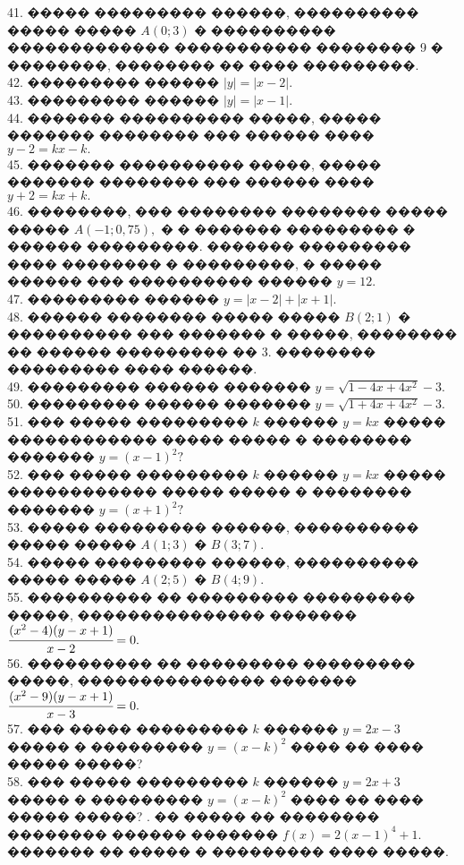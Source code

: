 \documentclass[12pt]{article}
\begin{document}
41. ����� ��������� ������, ���������� ����� ����� $A(0;3)$ � ���������� ������������� ����������� �������� 9 � ��������, �������� �� ���� ���������.\\
42. ��������� ������ $|y|=|x-2|.$\\
43. ��������� ������ $|y|=|x-1|.$\\
44. ������� ���������� �����, ����� ������� �������� ��� ������ ���� $y-2=kx-k.$\\
45. ������� ���������� �����, ����� ������� �������� ��� ������ ���� $y+2=kx+k.$\\
46. ��������, ��� �������� �������� ����� ����� $A(-1;0,75),$ � � ������� ��������� � ������ ���������. ������� ��������� ���� �������� � ���������, � ����� ������ ��� ���������� ������ $y=12.$\\
47. ��������� ������ $y=|x-2|+|x+1|.$\\
48. ������ �������� ����� ����� $B(2;1)$ � ���������� ��� ������� � �����, �������� �� ������ ��������� �� 3. �������� ��������� ���� ������.\\
49. ��������� ������ ������� $y=\sqrt{1-4x+4x^2}-3.$\\
50. ��������� ������ ������� $y=\sqrt{1+4x+4x^2}-3.$\\
51. ��� ����� ��������� $k$ ������ $y=kx$ ����� ������������ ����� �����
� �������� ������� $y=(x-1)^2?$\\
52. ��� ����� ��������� $k$ ������ $y=kx$ ����� ������������ ����� �����
� �������� ������� $y=(x+1)^2?$\\
53. ����� ��������� ������, ���������� ����� ����� $A(1;3)$ � $B(3;7).$\\
54. ����� ��������� ������, ���������� ����� ����� $A(2;5)$ � $B(4;9).$\\
55. ���������� �� ��������� ��������� �����, ��������������� �������
$\cfrac{(x^2-4)(y-x+1)}{x-2}=0.$\\
56. ���������� �� ��������� ��������� �����, ��������������� �������
$\cfrac{(x^2-9)(y-x+1)}{x-3}=0.$\\
57. ��� ����� ��������� $k$ ������ $y=2x-3$ ����� � ��������� $y=(x-k)^2$ ���� �� ���� ����� �����?\\
58. ��� ����� ��������� $k$ ������ $y=2x+3$ ����� � ��������� $y=(x-k)^2$ ���� �� ���� ����� �����?
\newpage
{}. �� ����� �� �������� �������� ������ ������� $f(x)=2(x-1)^4+1.$ ������� �� ����� � ��������� ���� �����.\\
\end{document}
